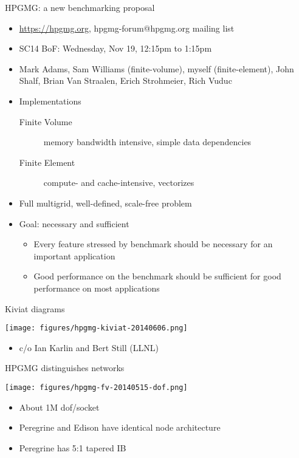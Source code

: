 \documentclass{beamer}
\begin{document}
\begin{frame}{HPGMG: a new benchmarking proposal}
  \begin{itemize}
  \item \url{https://hpgmg.org}, hpgmg-forum@hpgmg.org mailing list
  \item SC14 BoF: Wednesday, Nov 19, 12:15pm to 1:15pm
  \item Mark Adams, Sam Williams (finite-volume), myself (finite-element), John Shalf, Brian Van Straalen, Erich Strohmeier, Rich Vuduc
  \item Implementations
    \begin{description}
    \item[Finite Volume] memory bandwidth intensive, simple data dependencies
    \item[Finite Element] compute- and cache-intensive, vectorizes
    \end{description}
  \item Full multigrid, well-defined, scale-free problem
  \item Goal: necessary and sufficient
    \begin{itemize}
    \item Every feature stressed by benchmark should be necessary for an important application
    \item Good performance on the benchmark should be sufficient for good performance on most applications
    \end{itemize}
  \end{itemize}
\end{frame}

\begin{frame}{Kiviat diagrams}
  \begin{center}
    \texttt{[image: figures/hpgmg-kiviat-20140606.png]}
  \end{center}
  \begin{itemize}
  \item c/o Ian Karlin and Bert Still (LLNL)
  \end{itemize}
\end{frame}

\begin{frame}{HPGMG distinguishes networks}
  \begin{center}
    \texttt{[image: figures/hpgmg-fv-20140515-dof.png]}
  \end{center}
  \begin{itemize}
  \item About 1M dof/socket
  \item Peregrine and Edison have identical node architecture
  \item Peregrine has 5:1 tapered IB
  \end{itemize}
\end{frame}
\end{document}

